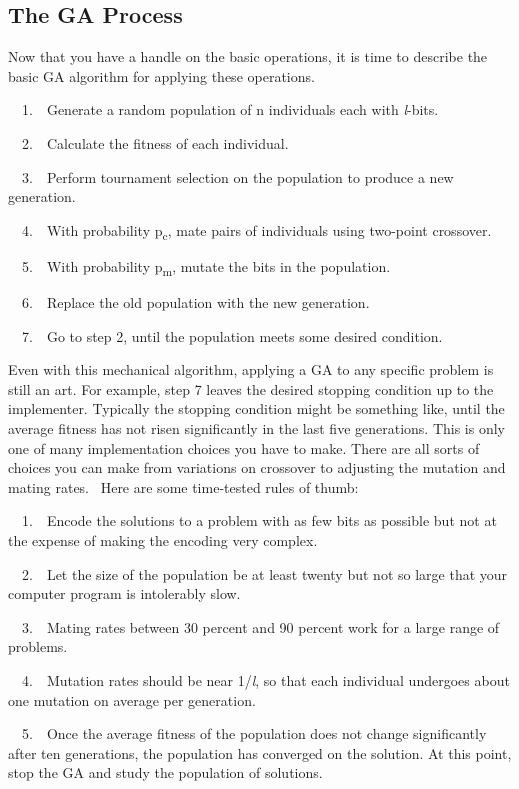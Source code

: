 \subsection{The GA Process}

Now that you have a handle on the basic operations, it is time to
describe the basic GA algorithm for applying these operations. 

\ \ 1.\ \ Generate a random population of n individuals each with
\textit{l}{}-bits.

\ \ 2.\ \ Calculate the fitness of each individual.

\ \ 3.\ \ Perform tournament selection on the population to produce a
new generation.

\ \ 4.\ \ With probability p\textsubscript{c}, mate pairs of individuals
using two-point crossover.

\ \ 5.\ \ With probability p\textsubscript{m}, mutate the bits in the
population.

\ \ 6.\ \ Replace the old population with the new generation.

\ \ 7.\ \ Go to step 2, until the population meets some desired
condition.

Even with this mechanical algorithm, applying a GA to any specific
problem is still an art. For example, step 7 leaves the desired
stopping condition up to the implementer. Typically the stopping
condition might be something like, until the average fitness has not
risen significantly in the last five generations. This is only one of
many implementation choices you have to make. There are all sorts of
choices you can make from variations on crossover to adjusting the
mutation and mating rates. \ Here are some time-tested rules of thumb:

\ \ 1.\ \ Encode the solutions to a problem with as few bits as possible
but not at the expense of making the encoding very complex. 

\ \ 2.\ \ Let the size of the population be at least twenty but not so
large that your computer program is intolerably slow. 

\ \ 3.\ \ Mating rates between 30 percent and 90 percent work for a
large range of problems.

\ \ 4.\ \ Mutation rates should be near 1/\textit{l}, so that each
individual undergoes about one mutation on average per generation.

\ \ 5.\ \ Once the average fitness of the population does not change
significantly after ten generations, the population has converged on
the solution. At this point, stop the GA and study the population of
solutions.

